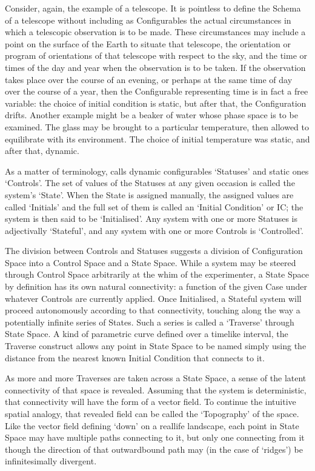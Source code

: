 \documentclass[letterpaper,10pt,english]{jupyterBook}
\begin{document}
\sphinxAtStartPar
Consider, again, the example of a telescope. It is pointless to define the Schema of a telescope without including as Configurables the actual circumstances in which a telescopic observation is to be made. These circumstances may include a point on the surface of the Earth to situate that telescope, the orientation or program of orientations of that telescope with respect to the sky, and the time or times of the day and year when the observation is to be taken. If the observation takes place over the course of an evening, or perhaps at the same time of day over the course of a year, then the Configurable representing time is in fact a free variable: the choice of initial condition is static, but after that, the Configuration drifts. Another example might be a beaker of water whose phase space is to be examined. The glass may be brought to a particular temperature, then allowed to equilibrate with its environment. The choice of initial temperature was static, and after that, dynamic.

\sphinxAtStartPar
As a matter of terminology,  calls dynamic configurables ‘Statuses’ and static ones ‘Controls’. The set of values of the Statuses at any given occasion is called the system’s ‘State’. When the State is assigned manually, the assigned values are called ‘Initials’ and the full set of them is called an ‘Initial Condition’ or IC; the system is then said to be ‘Initialised’. Any system with one or more Statuses is adjectivally ‘Stateful’, and any system with one or more Controls is ‘Controlled’.

\sphinxAtStartPar
The division between Controls and Statuses suggests a division of Configuration Space into a Control Space and a State Space. While a system may be steered through Control Space arbitrarily at the whim of the experimenter, a State Space by definition has its own natural connectivity: a function of the given Case under whatever Controls are currently applied.  Once Initialised, a Stateful system will proceed autonomously according to that connectivity, touching along the way a potentially infinite series of States. Such a series is called a ‘Traverse’ through State Space. A kind of parametric curve defined over a time\sphinxhyphen{}like interval, the Traverse construct allows any point in State Space to be named simply using the distance from the nearest known Initial Condition that connects to it.

\sphinxAtStartPar
As more and more Traverses are taken across a State Space, a sense of the latent connectivity of that space is revealed. Assuming that the system is deterministic, that connectivity will have the form of a vector field. To continue the intuitive spatial analogy, that revealed field can be called the ‘Topography’ of the space. Like the vector field defining ‘down’ on a real\sphinxhyphen{}life landscape, each point in State Space may have multiple paths connecting to it, but only one connecting from it \sphinxhyphen{} though the direction of that outward\sphinxhyphen{}bound path may (in the case of ‘ridges’) be infinitesimally divergent.
\end{document}
